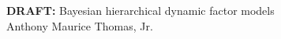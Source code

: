 \documentclass[12pt]{report}
\begin{document}

\begin{comment}
	{\graduationmonth{.}
	\graduationyear{.}
	\defensedate{.}
	\author{Anthony Maurice Thomas, Jr.}
	\committee{Li Wang}{Andrzej Korzeniowski}{Shan Sun-Mitchell}{Suvra Pal}{}
	\title{Bayesian hierarchical dynamic factor models}
	\titlepage}
\end{comment}

\begin{center}
	 {\bf DRAFT:} Bayesian hierarchical dynamic factor models \\
	Anthony Maurice Thomas, Jr.
\end{center} 
\newpage

\tableofcontents
{}%








\clearpage
\renewcommand{\bibname}{REFERENCES}


\end{document}
